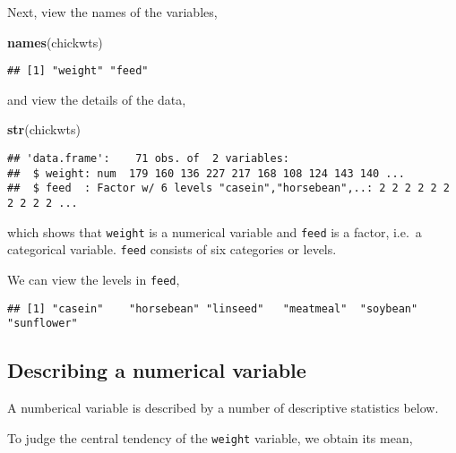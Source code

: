 \documentclass[]{book}
\newenvironment{Shaded}{\begin{snugshade}}{\end{snugshade}}
\newcommand{\KeywordTok}[1]{\textcolor[rgb]{0.13,0.29,0.53}{\textbf{{#1}}}}
\newcommand{\NormalTok}[1]{{#1}}
\theoremstyle{definition}
\theoremstyle{definition}
\theoremstyle{remark}
\begin{document}
Next, view the names of the variables,

\begin{Shaded}
\begin{Highlighting}[]
\KeywordTok{names}\NormalTok{(chickwts)}
\end{Highlighting}
\end{Shaded}

\begin{verbatim}
## [1] "weight" "feed"
\end{verbatim}

and view the details of the data,

\begin{Shaded}
\begin{Highlighting}[]
\KeywordTok{str}\NormalTok{(chickwts)}
\end{Highlighting}
\end{Shaded}

\begin{verbatim}
## 'data.frame':    71 obs. of  2 variables:
##  $ weight: num  179 160 136 227 217 168 108 124 143 140 ...
##  $ feed  : Factor w/ 6 levels "casein","horsebean",..: 2 2 2 2 2 2 2 2 2 2 ...
\end{verbatim}

which shows that \texttt{weight} is a numerical variable and
\texttt{feed} is a factor, i.e.~a categorical variable. \texttt{feed}
consists of six categories or levels.

We can view the levels in \texttt{feed},

\begin{Shaded}
\end{Shaded}

\begin{verbatim}
## [1] "casein"    "horsebean" "linseed"   "meatmeal"  "soybean"   "sunflower"
\end{verbatim}

\subsection{Describing a numerical
variable}\label{describing-a-numerical-variable}

A numberical variable is described by a number of descriptive statistics
below.

To judge the central tendency of the \texttt{weight} variable, we obtain
its mean,
\end{document}
